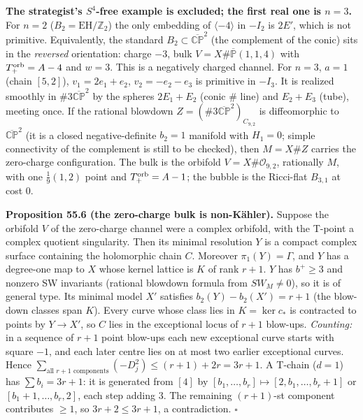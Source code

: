 \documentclass[
  10pt,
]{report}
\begin{document}
\textbf{The strategist's \(S^4\)-free example is excluded; the first
real one is \(n=3\).} For \(n=2\) (\(B_2=\mathrm{EH}/\mathbb Z_2\)) the
only embedding of \(\langle-4\rangle\) in \(-I_2\) is \(2E'\), which is
not primitive. Equivalently, the standard
\(B_2\subset\overline{\mathbb{CP}}^2\) (the complement of the conic)
sits in the \emph{reversed} orientation: charge \(-3\), bulk
\(V=X\#\overline{\mathbb P}(1,1,4)\) with \(T_+^{\rm orb}=A-4\) and
\(w=3\). This is a negatively charged channel. For \(n=3\), \(a=1\)
(chain \([5,2]\)), \(v_1=2e_1+e_2\), \(v_2=-e_2-e_3\) is primitive in
\(-I_3\). It is realized smoothly in \(\#3\overline{\mathbb{CP}}^2\) by
the spheres \(2E_1+E_2\) (conic \(\#\) line) and \(E_2+E_3\) (tube),
meeting once. If the rational blowdown
\(Z=(\#3\overline{\mathbb{CP}}^2)_{C_{9,2}}\) is diffeomorphic to
\(\overline{\mathbb{CP}}^2\) (it is a closed negative-definite \(b_2=1\)
manifold with \(H_1=0\); simple connectivity of the complement is still
to be checked), then \(M=X\#Z\) carries the zero-charge configuration.
The bulk is the orbifold \(V=X\#\mathcal O_{9,2}\), rationally \(M\),
with one \(\tfrac19(1,2)\) point and \(T_+^{\rm orb}=A-1\); the bubble
is the Ricci-flat \(B_{3,1}\) at cost \(0\).

\textbf{Proposition 55.6 (the zero-charge bulk is non-Kähler).} Suppose
the orbifold \(V\) of the zero-charge channel were a complex orbifold,
with the T-point a complex quotient singularity. Then its minimal
resolution \(Y\) is a compact complex surface containing the holomorphic
chain \(C\). Moreover \(\pi_1(Y)=\Gamma\), and \(Y\) has a degree-one
map to \(X\) whose kernel lattice is \(K\) of rank \(r+1\). \(Y\) has
\(b^+\ge3\) and nonzero SW invariants (rational blowdown formula from
\(SW_M\ne0\)), so it is of general type. Its minimal model \(X'\)
satisfies \(b_2(Y)-b_2(X')=r+1\) (the blow-down classes span \(K\)).
Every curve whose class lies in \(K=\ker c_*\) is contracted to points
by \(Y\to X'\), so \(C\) lies in the exceptional locus of \(r+1\)
blow-ups. \emph{Counting:} in a sequence of \(r+1\) point blow-ups each
new exceptional curve starts with square \(-1\), and each later centre
lies on at most two earlier exceptional curves. Hence
\(\sum_{\text{all }r+1\text{ components}}(-D_j^2)\le(r+1)+2r=3r+1\). A
T-chain (\(d=1\)) has \(\sum b_i=3r+1\): it is generated from \([4]\) by
\([b_1,\dots,b_r]\mapsto[2,b_1,\dots,b_r+1]\) or
\([b_1+1,\dots,b_r,2]\), each step adding \(3\). The remaining
\((r+1)\)-st component contributes \(\ge1\), so \(3r+2\le3r+1\), a
contradiction. \(\square\)
\end{document}
